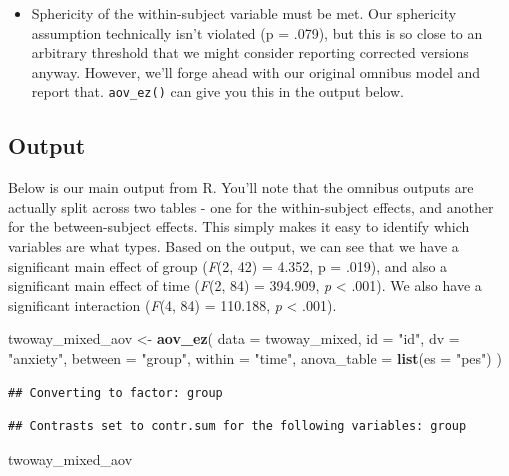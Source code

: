 \documentclass[
]{book}
\newenvironment{Shaded}{\begin{snugshade}}{\end{snugshade}}
\newcommand{\AttributeTok}[1]{\textcolor[rgb]{0.13,0.29,0.53}{#1}}
\newcommand{\FunctionTok}[1]{\textcolor[rgb]{0.13,0.29,0.53}{\textbf{#1}}}
\newcommand{\NormalTok}[1]{#1}
\newcommand{\OtherTok}[1]{\textcolor[rgb]{0.56,0.35,0.01}{#1}}
\newcommand{\StringTok}[1]{\textcolor[rgb]{0.31,0.60,0.02}{#1}}
\providecommand{\tightlist}{%
  \setlength{\itemsep}{0pt}\setlength{\parskip}{0pt}}
\begin{document}
\begin{itemize}
\tightlist
\item
  Sphericity of the within-subject variable must be met. Our sphericity assumption technically isn't violated (p = .079), but this is so close to an arbitrary threshold that we might consider reporting corrected versions anyway. However, we'll forge ahead with our original omnibus model and report that. \texttt{aov\_ez()} can give you this in the output below.
\end{itemize}

\subsection{Output}\label{output-9}

Below is our main output from R. You'll note that the omnibus outputs are actually split across two tables - one for the within-subject effects, and another for the between-subject effects. This simply makes it easy to identify which variables are what types. Based on the output, we can see that we have a significant main effect of group (\emph{F}(2, 42) = 4.352, p = .019), and also a significant main effect of time (\emph{F}(2, 84) = 394.909, \emph{p} \textless{} .001). We also have a significant interaction (\emph{F}(4, 84) = 110.188, \emph{p} \textless{} .001).

\begin{Shaded}
\begin{Highlighting}[]
\NormalTok{twoway\_mixed\_aov }\OtherTok{\textless{}{-}} \FunctionTok{aov\_ez}\NormalTok{(}
  \AttributeTok{data =}\NormalTok{ twoway\_mixed,}
  \AttributeTok{id =} \StringTok{"id"}\NormalTok{,}
  \AttributeTok{dv =} \StringTok{"anxiety"}\NormalTok{,}
  \AttributeTok{between =} \StringTok{"group"}\NormalTok{,}
  \AttributeTok{within =} \StringTok{"time"}\NormalTok{,}
  \AttributeTok{anova\_table =} \FunctionTok{list}\NormalTok{(}\AttributeTok{es =} \StringTok{"pes"}\NormalTok{)}
\NormalTok{)}
\end{Highlighting}
\end{Shaded}

\begin{verbatim}
## Converting to factor: group
\end{verbatim}

\begin{verbatim}
## Contrasts set to contr.sum for the following variables: group
\end{verbatim}

\begin{Shaded}
\begin{Highlighting}[]
\NormalTok{twoway\_mixed\_aov}
\end{Highlighting}
\end{Shaded}
\end{document}
